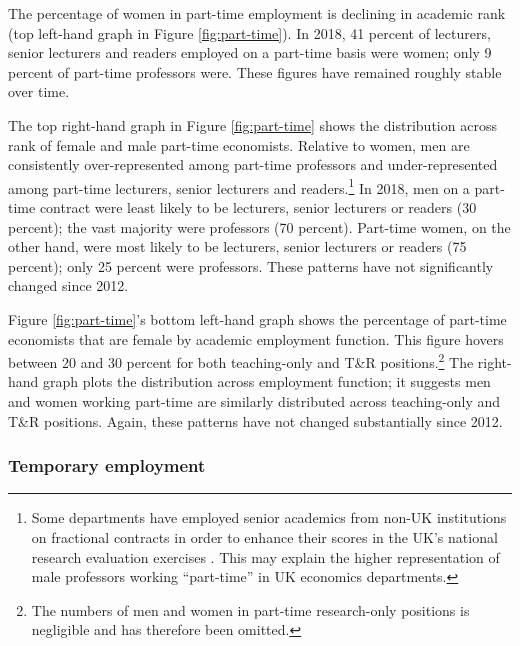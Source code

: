 \documentclass[a4paper, 1]{article}
\begin{document}
The percentage of women in part-time employment is declining in academic rank (top left-hand graph in Figure \ref{fig:part-time}). In 2018, 41 percent of lecturers, senior lecturers and readers employed on a part-time basis were women; only 9 percent of part-time professors were. These figures have remained roughly stable over time.

The top right-hand graph in Figure \ref{fig:part-time} shows the distribution across rank of female and male part-time economists. Relative to women, men are consistently over-represented among part-time professors and under-represented among part-time lecturers, senior lecturers and readers.\footnote{Some departments have employed senior academics from non-UK institutions on fractional contracts in order to enhance their scores in the UK's national research evaluation exercises \citep[see, \emph{e.g.},][]{Stern2016}. This may explain the higher representation of male professors working ``part-time'' in UK economics departments.} In 2018, men on a part-time contract were least likely to be lecturers, senior lecturers or readers (30 percent); the vast majority were professors (70 percent). Part-time women, on the other hand, were most likely to be lecturers, senior lecturers or readers (75 percent); only 25 percent were professors. These patterns have not significantly changed since 2012.

Figure \ref{fig:part-time}'s bottom left-hand graph shows the percentage of part-time economists that are female by academic employment function. This figure hovers between 20 and 30 percent for both teaching-only and T\&R positions.\footnote{The numbers of men and women in part-time research-only positions is negligible and has therefore been omitted.} The right-hand graph plots the distribution across employment function; it suggests men and women working part-time are similarly distributed across teaching-only and T\&R positions. Again, these patterns have not changed substantially since 2012.

\hypertarget{sec:staff-temp}{%
\subsubsection{Temporary employment}\label{sec:staff-temp}}
\end{document}
